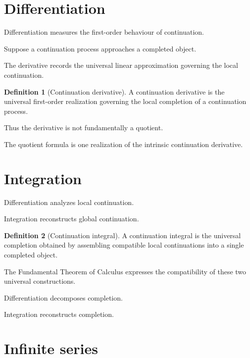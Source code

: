 \documentclass[13pt,openany]{book}
\theoremstyle{plain}
\theoremstyle{definition}
\newtheorem{definition}{Definition}[chapter]
\begin{document}
\section{Differentiation}

Differentiation measures the first-order behaviour of continuation.

Suppose a continuation process approaches a completed object.

The derivative records the universal linear approximation governing the local
continuation.

\begin{definition}[Continuation derivative]
A continuation derivative is the universal first-order realization governing
the local completion of a continuation process.
\end{definition}

Thus the derivative is not fundamentally a quotient.

The quotient formula is one realization of the intrinsic continuation
derivative.

\section{Integration}

Differentiation analyzes local continuation.

Integration reconstructs global continuation.

\begin{definition}[Continuation integral]
A continuation integral is the universal completion obtained by assembling
compatible local continuations into a single completed object.
\end{definition}

The Fundamental Theorem of Calculus expresses the compatibility of these two
universal constructions.

Differentiation decomposes completion.

Integration reconstructs completion.

\section{Infinite series}
\end{document}
